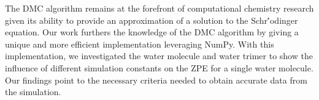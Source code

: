 \documentclass[journal=jacsat,manuscript=article]{achemso}
\begin{document}
The DMC algorithm remains at the forefront of computational chemistry research given its ability to provide an approximation of a solution to the Schr\''odinger equation. Our work furthers the knowledge of the DMC algorithm by giving a unique and more efficient implementation leveraging NumPy. With this implementation, we investigated the water molecule and water trimer to show the influence of different simulation constants on the ZPE for a single water molecule. Our findings point to the necessary criteria needed to obtain accurate data from the simulation. 



\end{document}
